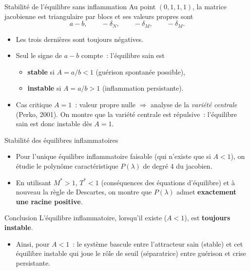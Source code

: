 \documentclass[aspectratio=169,12pt]{beamer}
\begin{document}
\begin{frame}{Stabilité de l'équilibre sans inflammation}
Au point $(0,1,1,1)$, la matrice jacobienne est triangulaire par blocs et ses valeurs propres sont
\[
a-b, \qquad -\delta_N, \qquad -\delta_M, \qquad -\delta_M.
\]
\begin{itemize}
\item Les trois dernières sont toujours négatives.
\item Seul le signe de $a-b$ compte~: l'équilibre sain est
\begin{itemize}
\item \textbf{stable} si $A=a/b < 1$ (guérison spontanée possible),
\item \textbf{instable} si $A = a/b > 1$ (inflammation persistante).
\end{itemize}
\item Cas critique $A=1$~: valeur propre nulle $\Rightarrow$ analyse de la \emph{variété centrale} (Perko, 2001). On montre que la variété centrale est \alert{répulsive}~: l'équilibre sain est donc instable dès $A=1$.
\end{itemize}
\end{frame}

\begin{frame}{Stabilité des équilibres inflammatoires}
\begin{itemize}
\item Pour l'unique équilibre inflammatoire faisable (qui n'existe que si $A<1$), on étudie le polynôme caractéristique $P(\lambda)$ de degré 4 du jacobien.
\item En utilisant $M^*>1$, $T^*<1$ (conséquences des équations d'équilibre) et à nouveau la règle de Descartes, on montre que $P(\lambda)$ admet \textbf{exactement une racine positive}.
\end{itemize}
\begin{alertblock}{Conclusion}
L'équilibre inflammatoire, lorsqu'il existe ($A<1$), est \textbf{toujours instable}.
\end{alertblock}
\begin{itemize}
\item Ainsi, pour $A<1$~: le système bascule entre l'attracteur sain (stable) et cet équilibre instable qui joue le rôle de \alert{seuil} (séparatrice) entre guérison et crise persistante.
\end{itemize}
\end{frame}
\end{document}

